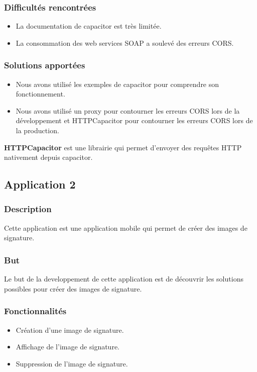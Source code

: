 \subsubsection{Difficultés rencontrées}
\begin{itemize}
    \item La documentation de capacitor est très limitée.
    \item La consommation des web services SOAP a soulevé des erreurs CORS.
\end{itemize}

\subsubsection{Solutions apportées}
\begin{itemize}
    \item Nous avons utilisé les exemples de capacitor pour comprendre son fonctionnement.
    \item Nous avons utilisé un proxy pour contourner les erreurs CORS lors de la développement et HTTPCapacitor pour contourner les erreurs CORS lors de la production.
\end{itemize}

\textbf{HTTPCapacitor} est une librairie qui permet d'envoyer des requêtes HTTP nativement depuis capacitor.

\subsection{Application 2 }

\subsubsection{Description}
Cette application est une application mobile qui permet de créer des images de signature.

\subsubsection{But}
Le but de la developpement de cette application est de découvrir les solutions possibles pour créer des images de signature.

\subsubsection{Fonctionnalités}
\begin{itemize}
    \item Création d'une image de signature.
    \item Affichage de l'image de signature.
    \item Suppression de l'image de signature.
\end{itemize}

